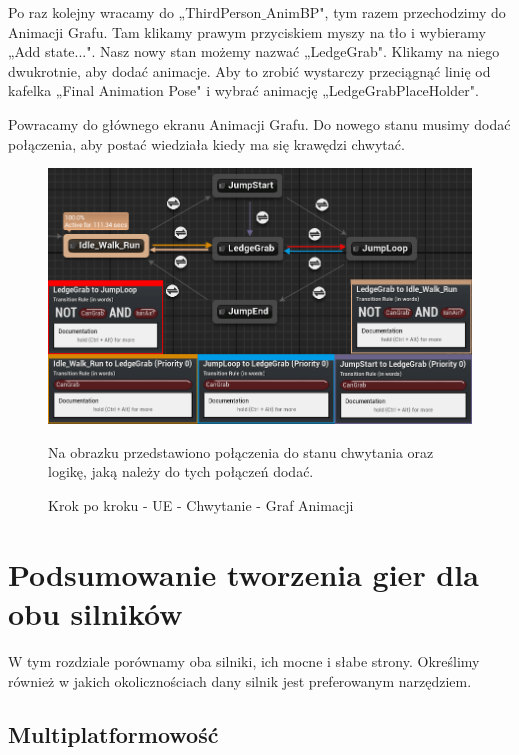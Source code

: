 \documentclass[12pt]{xmgr}
\begin{document}
\newpage
Po raz kolejny wracamy do „ThirdPerson$\_$AnimBP", tym razem przechodzimy do Animacji Grafu. Tam klikamy prawym przyciskiem myszy na tło i wybieramy „Add state...". Nasz nowy stan możemy nazwać „LedgeGrab". Klikamy na niego dwukrotnie, aby dodać animacje. Aby to zrobić wystarczy przeciągnąć linię od kafelka „Final Animation Pose" i wybrać animację „LedgeGrabPlaceHolder".

Powracamy do głównego ekranu Animacji Grafu. Do nowego stanu musimy dodać połączenia, aby postać wiedziała kiedy ma się krawędzi chwytać.

\begin{figure}[!htb]
    \begin{center}
    \includegraphics[scale=0.5]{Screeny/UeKrokPoKroku/UE-AnimGraph}
    \end{center}
    \caption{Krok po kroku - UE - Chwytanie - Graf Animacji}
    Na obrazku przedstawiono połączenia do stanu chwytania oraz logikę, jaką należy do tych połączeń dodać.
\end{figure}



\chapter{Podsumowanie tworzenia gier dla obu silników}

W tym rozdziale porównamy  oba silniki, ich mocne i słabe strony. Określimy również w jakich okolicznościach dany silnik jest preferowanym narzędziem.

\section{Multiplatformowość}
\end{document}
